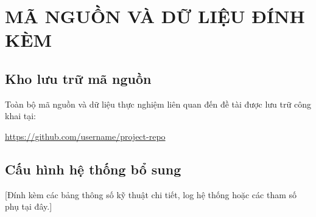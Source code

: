 \chapter{MÃ NGUỒN VÀ DỮ LIỆU ĐÍNH KÈM}
\label{chap:appendix_a}

\section{Kho lưu trữ mã nguồn}
Toàn bộ mã nguồn và dữ liệu thực nghiệm liên quan đến đề tài được lưu trữ công khai tại:
\begin{center}
    \url{https://github.com/username/project-repo}
\end{center}

\section{Cấu hình hệ thống bổ sung}
[Đính kèm các bảng thông số kỹ thuật chi tiết, log hệ thống hoặc các tham số phụ tại đây.]
